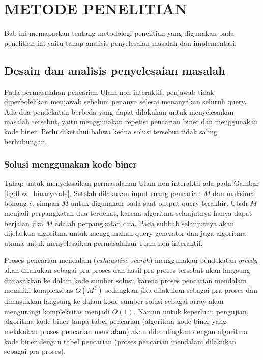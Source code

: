 \chapter{METODE PENELITIAN}

Bab ini memaparkan tentang metodologi penelitian yang digunakan pada penelitian ini yaitu tahap analisis penyelesaian masalah dan implementasi.

\section{Desain dan analisis penyelesaian masalah}

Pada permasalahan pencarian Ulam non interaktif, penjawab tidak diperbolehkan menjawab sebelum penanya selesai menanyakan seluruh query. Ada dua pendekatan berbeda yang dapat dilakukan untuk menyelesaikan masalah tersebut, yaitu menggunakan repetisi pencarian biner dan menggunakan kode biner. Perlu diketahui bahwa kedua solusi tersebut tidak saling berhubungan.

\subsection{Solusi menggunakan kode biner}

Tahap untuk menyelesaikan permasalahan Ulam non interaktif ada pada Gambar \ref{fig:flow_binarycode}. Setelah dilakukan input ruang pencarian $M$ dan maksimal bohong $e$, simpan $M$ untuk digunakan pada saat output query terakhir. Ubah $M$ menjadi perpangkatan dua terdekat, karena algoritma selanjutnya hanya dapat berjalan jika $M$ adalah perpangkatan dua. Pada subbab selanjutnya akan dijelaskan algoritma untuk menggunakan query generator dan juga algoritma utama untuk menyelesaikan permasalahan Ulam non interaktif.

Proses pencarian mendalam (\textit{exhaustive search}) menggunakan pendekatan \textit{greedy} akan dilakukan sebagai pra proses dan hasil pra proses tersebut akan langsung dimasukkan ke dalam kode sumber solusi, karena proses pencarian mendalam memiliki kompleksitas $O(M^3)$ sedangkan jika dilakukan sebagai pra proses dan dimasukkan langsung ke dalam kode sumber solusi sebagai array akan mengurangi kompleksitas menjadi $O(1)$. Namun untuk keperluan pengujian, algoritma kode biner tanpa tabel pencarian (algoritma kode biner yang melakukan proses pencarian mendalam) akan dibandingkan dengan algoritma kode biner dengan tabel pencarian (proses pencarian mendalam dilakukan sebagai pra proses).

